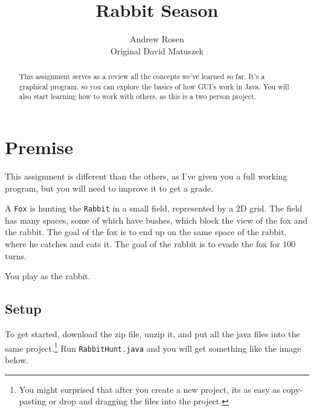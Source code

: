 \documentclass[10pt,letterpaper]{article}
\author{Andrew Rosen\\ Original David Matuszek}
\title{Rabbit Season}
\date{}
\begin{document}
	
	\maketitle
	
	
	\begin{abstract}
		This assignment serves as a review all the concepts we've learned so far.  
		It's a graphical program, so you can explore the basics of how GUI's work in Java.
		You will also start learning how to work with others, as this is a two person project.
	
	\end{abstract}
	
	\section{Premise}
		
	This assignment is different than the others, as I've given you a full working program, but you will need to improve it to get a grade.
	
	A \texttt{Fox} is hunting the \texttt{Rabbit} in a small field, represented by a 2D grid.
	The field has many spaces, some of which have bushes, which block the view of the fox and the rabbit.
	The goal of the fox is to end up on the same space of the rabbit, where he catches and eats it.
	The goal of the rabbit is to evade the fox for 100 turns.
	
	You play as the rabbit.
	
	\subsection{Setup}
	To get started, download the zip file, unzip it, and put all the java files into the same project.\footnote{You might surprised that after you create a new project, its as easy as copy-pasting or drop and dragging the files into the project.}
	Run \texttt{RabbitHunt.java} and you will get something like the image below.
	
\end{document}
